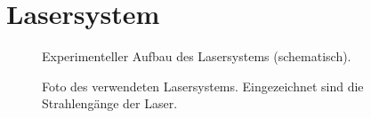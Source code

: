 \section{Lasersystem}\label{sec:lasersystem}
\begin{figure}[h]
 	\centering
	\caption[Experimenteller Aufbau des Lasersystems, schematisch]{Experimenteller
	Aufbau des Lasersystems
	(schematisch).}\label{fig:experimenteller_aufbau_lasersystem}
\end{figure}
\begin{figure}[h]
 	\centering
	\caption[Experimenteller Aufbau des Lasersystems -
	Foto]{Foto des
	verwendeten Lasersystems.
	Eingezeichnet sind die
	Strahlengänge der Laser.}\label{fig:experimenteller_aufbau_lasersystem_foto}
\end{figure}
